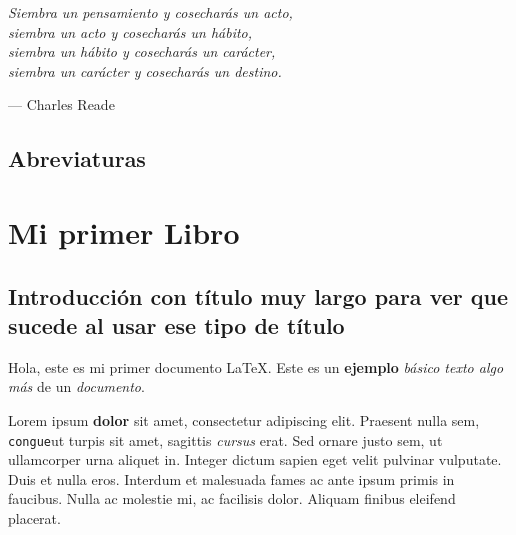 \documentclass[b5paper, 10pt]{book}
\begin{document}
\cleardoublepage
\null{}
\hfill
\begin{minipage}{8cm}
	\textsl{Siembra un pensamiento y cosecharás un acto,}\\
	\textsl{siembra un acto y cosecharás un hábito,}\\
	\textsl{siembra un hábito y cosecharás un carácter,}\\
	\textsl{siembra un carácter y cosecharás un destino.}
	\begin{flushright}
		--- Charles Reade
	\end{flushright}
\end{minipage}


\cleardoublepage
\pagestyle{empty}
	
	\tableofcontents
	\listoffigures
	\listoftables

\section*{Abreviaturas}

	

\pagestyle{fancy}
	
\mainmatter
	
	\chapter{Mi primer Libro}
	\section[Introducción]{Introducción con título muy largo para ver que sucede al usar ese tipo de título }
	Hola, este es mi primer documento LaTeX. 
	Este es un \textbf{ejemplo} \textit{ básico \emph{texto} algo más} de un \textsl{documento}.  
	
	Lorem ipsum \textbf{dolor} sit amet, consectetur adipiscing elit. Praesent nulla sem, \texttt{congue}ut turpis sit amet, sagittis \emph{cursus} erat. Sed ornare justo sem, ut ullamcorper urna aliquet in. Integer dictum sapien eget velit pulvinar vulputate. Duis et nulla eros. Interdum et malesuada fames ac ante ipsum primis in faucibus. Nulla ac molestie mi, ac facilisis dolor. Aliquam finibus eleifend placerat.
	
\end{document}
